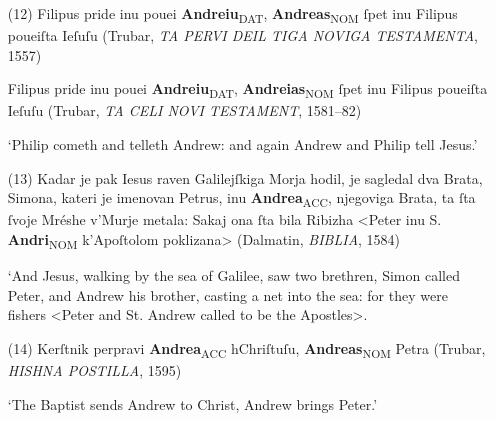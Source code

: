 \documentclass[output=paper,colorlinks,citecolor=brown,arabicfont,chinesefont]{langscibook}
\begin{document}
\begin{itemize}
    \item[(12)] Filipus pride inu pouei \textbf{Andreiu}\textsubscript{DAT}, \textbf{Andreas}\textsubscript{NOM} ſpet inu Filipus poueiſta Ieſuſu (Trubar, \emph{TA PERVI DEIL TIGA NOVIGA TESTAMENTA}, 1557)
    
    Filipus pride inu pouei \textbf{Andreiu}\textsubscript{DAT}, \textbf{Andreias}\textsubscript{NOM} ſpet inu Filipus poueiſta Ieſuſu (Trubar, \emph{TA CELI NOVI TESTAMENT}, 1581--82)

    ‘Philip cometh and telleth Andrew: and again Andrew and Philip tell Jesus.’

    \item[(13)] Kadar je pak Iesus raven Galilejſkiga Morja hodil, je sagledal dva Brata, Simona, kateri je imenovan Petrus, inu \textbf{Andrea}\textsubscript{ACC}, njegoviga Brata, ta ſta ſvoje Mréshe v'Murje metala: Sakaj ona ſta bila Ribizha <Peter inu S. \textbf{Andri}\textsubscript{NOM} k'Apoſtolom poklizana> (Dalmatin, \emph{BIBLIA}, 1584)
    
    ‘And Jesus, walking by the sea of Galilee, saw two brethren, Simon called Peter, and Andrew his brother, casting a net into the sea: for they were fishers <Peter and St. Andrew called to be the Apostles>.

    \item[(14)] Kerſtnik perpravi \textbf{Andrea}\textsubscript{ACC} hChriſtuſu, \textbf{Andreas}\textsubscript{NOM} Petra (Trubar, \emph{HISHNA POSTILLA}, 1595)
    
    ‘The Baptist sends Andrew to Christ, Andrew brings Peter.’

\end{itemize}
\end{document}

